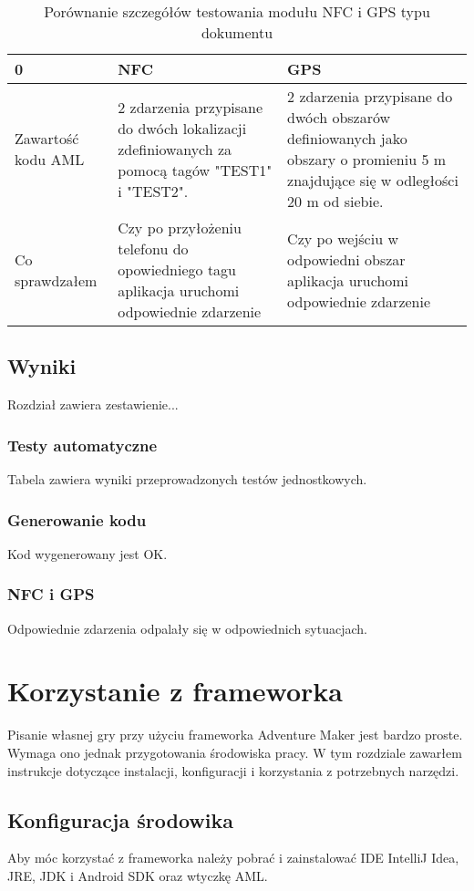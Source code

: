 \documentclass	{xmgr}
\begin{document}
\begin{table}[!tbh]
	\begin{tabular}{|l|l|l|} \hline
		0 & NFC & GPS \\ \hline
		Zawartość kodu AML & 2 zdarzenia przypisane do dwóch lokalizacji zdefiniowanych za pomocą tagów "TEST1" i "TEST2". & 2 zdarzenia przypisane do dwóch obszarów definiowanych jako obszary o promieniu 5 m znajdujące się w odległości 20 m od siebie. \\ \hline
		Co sprawdzałem  & Czy po przyłożeniu telefonu do opowiedniego tagu aplikacja uruchomi odpowiednie zdarzenie & Czy po wejściu w odpowiedni obszar aplikacja uruchomi odpowiednie zdarzenie \\ \hline
	\end{tabular}
	\caption{Porównanie szczegółów testowania modułu NFC i GPS
		typu dokumentu}
\end{table}

\section{Wyniki}
Rozdział zawiera zestawienie...

\subsection{Testy automatyczne}
Tabela zawiera wyniki przeprowadzonych testów jednostkowych.

\subsection{Generowanie kodu}
Kod wygenerowany jest OK.

\subsection{NFC i GPS}
Odpowiednie zdarzenia odpalały się w odpowiednich sytuacjach.


\chapter{Korzystanie z frameworka}
Pisanie własnej gry przy użyciu frameworka Adventure Maker jest bardzo proste. Wymaga ono jednak przygotowania środowiska pracy.
W tym rozdziale zawarłem instrukcje dotyczące instalacji, konfiguracji i korzystania z potrzebnych narzędzi. 
\section{Konfiguracja środowika}
Aby móc korzystać z frameworka należy pobrać i zainstalować IDE IntelliJ Idea, JRE, JDK i Android SDK oraz wtyczkę AML.
\end{document}

